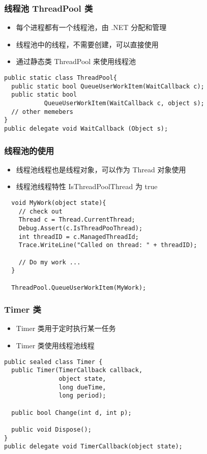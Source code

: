 \begin{frame}[fragile]
\frametitle{线程池 ThreadPool 类}
\begin{itemize}
\item 每个进程都有一个线程池，由 .NET 分配和管理
\item 线程池中的线程，不需要创建，可以直接使用
\item 通过静态类 ThreadPool 来使用线程池
\end{itemize}
\begin{lstlisting}
public static class ThreadPool{
  public static bool QueueUserWorkItem(WaitCallback c);
  public static bool
           QueueUserWorkItem(WaitCallback c, object s);
  // other memebers
}
public delegate void WaitCallback (Object s);
\end{lstlisting}
\end{frame}

\begin{frame}[fragile]
\frametitle{线程池的使用}
\begin{itemize}
\item 线程池线程也是线程对象，可以作为 Thread 对象使用
\item 线程池线程特性 IsThreadPoolThread 为 true
\end{itemize}
\begin{lstlisting}
  void MyWork(object state){
    // check out
    Thread c = Thread.CurrentThread;
    Debug.Assert(c.IsThreadPooThread);
    int threadID = c.ManagedThreadId;
    Trace.WriteLine("Called on thread: " + threadID);

    // Do my work ...
  }

  ThreadPool.QueueUserWorkItem(MyWork);
\end{lstlisting}
\end{frame}


\begin{frame}[fragile]
\frametitle{Timer 类}
\begin{itemize}
\item Timer 类用于定时执行某一任务
\item Timer 类使用线程池线程
\end{itemize}
\begin{lstlisting}
public sealed class Timer {
  public Timer(TimerCallback callback,
               object state,
               long dueTime, 
               long period);

  public bool Change(int d, int p);

  public void Dispose();
}
public delegate void TimerCallback(object state);
\end{lstlisting}
\end{frame}

